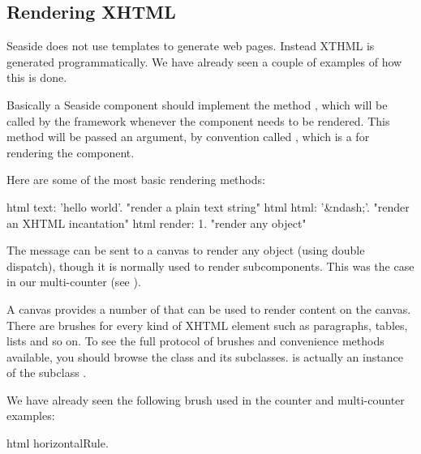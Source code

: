 \documentclass[a4paper,10pt,twoside]{book}
\begin{document}
\subsection{Rendering XHTML}

Seaside does not use templates to generate web pages.
Instead XTHML is generated programmatically.
We have already seen a couple of examples of how this is done.

Basically a Seaside component should implement the method , which will be called by the framework whenever the component needs to be rendered.
This method will be passed an argument, by convention called , which is a  for rendering the component.

Here are some of the most basic rendering methods:
\begin{code}{}
html text: 'hello world'.  "render a plain text string"
html html: '&ndash;'.     "render an XHTML incantation"
html render: 1.              "render any object"
\end{code}

The message  can be sent to a canvas to render any object (using double dispatch), though it is normally used to render subcomponents.
This was the case in our multi-counter (see ).

A canvas provides a number of  that can be used to render content on the canvas.
There are brushes for every kind of XHTML element such as paragraphs, tables, lists and so on.
To see the full protocol of brushes and convenience methods available, you should browse the class  and its subclasses.
 is actually an instance of the subclass .

We have already seen the following brush used in the counter and multi-counter examples:
\begin{code}{}
html horizontalRule.
\end{code}
\end{document}
